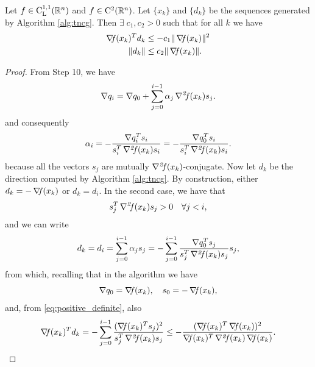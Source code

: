 \documentclass[10pt,a4paper]{article}
\begin{document}
\begin{proposition}\label{prop:truncated_newton}
	Let $f \in \mathord{\mathrm{C^{1,1}_{L}}}(\mathbb{R}^n)$ and $f\in \mathord{\mathrm{C^2}}(\mathbb{R}^n)$. Let $\{x_k\}$ and $\{d_k\}$ be the sequences generated by Algorithm \ref{alg:tncg}. Then $\exists\; c_1, c_2>0$ such that for all $k$ we have
	\begin{equation}\label{eq:gradient_related}
		\begin{split}
			\operatorname*{\mathit{\nabla \!f}}(x_k)^T d_k &\leq -c_1 \|\operatorname*{\mathit{\nabla \!f}}(x_k)\|^2 \\
			\|d_k\| &\leq c_2 \|\operatorname*{\mathit{\nabla \!f}}(x_k)\|. 
		\end{split}
\end{equation}
\end{proposition}
\begin{proof}
	
From Step 10, we have
\begin{equation*}
	\nabla q_i = \nabla q_0 + \sum_{j=0}^{i-1} \alpha_j \operatorname*{\mathit{\nabla^2 \!f}}(x_k) s_j.
\end{equation*}
and consequently
\begin{equation*}
	\alpha_i = -\frac{\nabla q_i^T s_i}{s_i^T \operatorname*{\mathit{\nabla^2 \!f}}(x_k) s_i} = - \frac{\nabla q_0^T s_i}{s_i^T \operatorname*{\mathit{\nabla^2 \!f}}(x_k) s_i}.
\end{equation*}
because all the vectors $s_j$ are mutually $\operatorname*{\mathit{\nabla^2 \!f}}(x_k)$-conjugate. Now let $d_k$ be the direction computed by Algorithm \ref{alg:tncg}. By construction, either $d_k = -\operatorname*{\mathit{\nabla \!f}}(x_k)$ or $d_k = d_i$. In the second case, we have that 
\begin{equation}\label{eq:positive_definite}
	s_j^T \operatorname*{\mathit{\nabla^2 \!f}}(x_k) s_j>0 \quad \forall j < i,
\end{equation}
and we can write
\begin{equation*}
d_k = d_i = \sum_{j=0}^{i-1} \alpha_j s_j = -\sum_{j=0}^{i-1} \frac{\nabla q_0^T s_j}{s_j^T \operatorname*{\mathit{\nabla^2 \!f}}(x_k) s_j} s_j,
\end{equation*}
from which, recalling that in the algorithm we have
\begin{equation*}
\nabla q_0 = \operatorname*{\mathit{\nabla \!f}}(x_k), \quad s_0 = -\operatorname*{\mathit{\nabla \!f}}(x_k),
\end{equation*}
and, from \eqref{eq:positive_definite}, also
\begin{equation*}
\grad(x_k)^T d_k = -\sum_{j=0}^{i-1} \frac{(\grad(x_k)^T s_j)^2}{s_j^T \hess(x_k) s_j} \leq -\frac{(\grad(x_k)^T \grad(x_k))^2}{\grad(x_k)^T \hess(x_k) \grad(x_k)}.
\end{equation*}

\end{proof}
\end{document}
